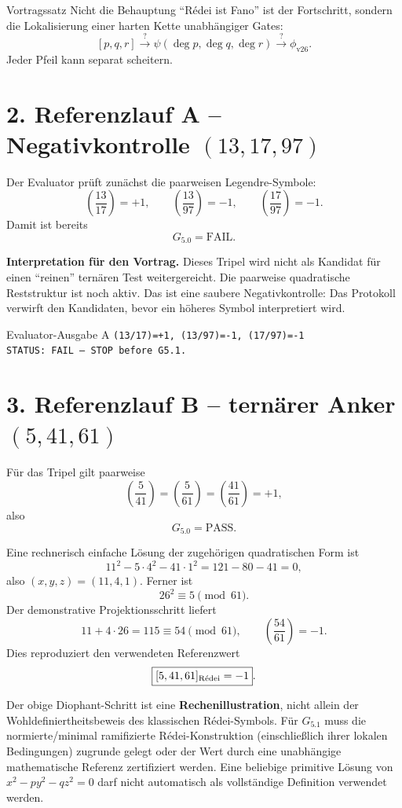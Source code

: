 \documentclass[11pt,a4paper]{article}
\begin{document}
\begin{statusbox}{Vortragssatz}
Nicht die Behauptung ``Rédei ist Fano'' ist der Fortschritt, sondern die Lokalisierung einer harten Kette unabhängiger Gates:
\[
[p,q,r]
\stackrel{?}{\longrightarrow}
\psi(\deg p,\deg q,\deg r)
\stackrel{?}{\longrightarrow}
\phi_{\mathrm{v26}}.
\]
Jeder Pfeil kann separat scheitern.
\end{statusbox}

\section*{2. Referenzlauf A -- Negativkontrolle $(13,17,97)$}

Der Evaluator prüft zunächst die paarweisen Legendre-Symbole:
\[
\left(\frac{13}{17}\right)=+1,\qquad
\left(\frac{13}{97}\right)=-1,\qquad
\left(\frac{17}{97}\right)=-1.
\]
Damit ist bereits
\[
\boxed{G_{5.0}=\mathrm{FAIL}}.
\]

\textbf{Interpretation für den Vortrag.} Dieses Tripel wird nicht als Kandidat für einen ``reinen'' ternären Test weitergereicht. Die paarweise quadratische Reststruktur ist noch aktiv. Das ist eine saubere Negativkontrolle: Das Protokoll verwirft den Kandidaten, bevor ein höheres Symbol interpretiert wird.

\begin{statusbox}{Evaluator-Ausgabe A}
\texttt{(13/17)=+1, (13/97)=-1, (17/97)=-1}\\
\texttt{STATUS: FAIL -- STOP before G5.1.}
\end{statusbox}

\newpage
\section*{3. Referenzlauf B -- ternärer Anker $(5,41,61)$}

Für das Tripel gilt paarweise
\[
\left(\frac{5}{41}\right)=
\left(\frac{5}{61}\right)=
\left(\frac{41}{61}\right)=+1,
\]
also
\[
\boxed{G_{5.0}=\mathrm{PASS}}.
\]

Eine rechnerisch einfache Lösung der zugehörigen quadratischen Form ist
\[
11^2-5\cdot4^2-41\cdot1^2=121-80-41=0,
\]
also $(x,y,z)=(11,4,1)$. Ferner ist
\[
26^2\equiv5\pmod{61}.
\]
Der demonstrative Projektionsschritt liefert
\[
11+4\cdot26=115\equiv54\pmod{61},
\qquad
\left(\frac{54}{61}\right)=-1.
\]
Dies reproduziert den verwendeten Referenzwert
\[
\boxed{[5,41,61]_{\rm R\acute{e}dei}=-1}.
\]

\begin{warningbox}
Der obige Diophant-Schritt ist eine \textbf{Rechenillustration}, nicht allein der Wohldefiniertheitsbeweis des klassischen Rédei-Symbols. Für $G_{5.1}$ muss die normierte/minimal ramifizierte Rédei-Konstruktion (einschließlich ihrer lokalen Bedingungen) zugrunde gelegt oder der Wert durch eine unabhängige mathematische Referenz zertifiziert werden. Eine beliebige primitive Lösung von $x^2-py^2-qz^2=0$ darf nicht automatisch als vollständige Definition verwendet werden.
\end{warningbox}
\end{document}
